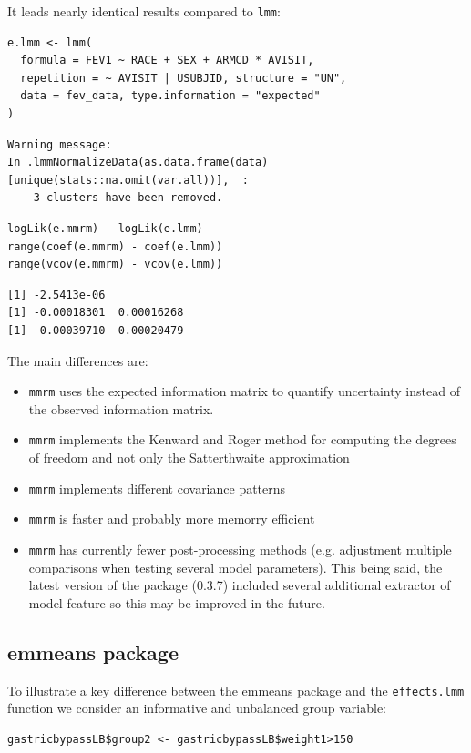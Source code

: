 \documentclass[12pt]{article}
\begin{document}
It leads nearly identical results compared to \texttt{lmm}:
\lstset{language=r,label= ,caption= ,captionpos=b,numbers=none}
\begin{lstlisting}
e.lmm <- lmm(
  formula = FEV1 ~ RACE + SEX + ARMCD * AVISIT,
  repetition = ~ AVISIT | USUBJID, structure = "UN",
  data = fev_data, type.information = "expected"
)
\end{lstlisting}
\begin{verbatim}
Warning message:
In .lmmNormalizeData(as.data.frame(data)[unique(stats::na.omit(var.all))],  :
    3 clusters have been removed.
\end{verbatim}


\lstset{language=r,label= ,caption= ,captionpos=b,numbers=none}
\begin{lstlisting}
logLik(e.mmrm) - logLik(e.lmm)
range(coef(e.mmrm) - coef(e.lmm))
range(vcov(e.mmrm) - vcov(e.lmm))
\end{lstlisting}

\begin{verbatim}
[1] -2.5413e-06
[1] -0.00018301  0.00016268
[1] -0.00039710  0.00020479
\end{verbatim}


The main differences are:
\begin{itemize}
\item \texttt{mmrm} uses the expected information matrix to quantify uncertainty
instead of the observed information matrix.
\item \texttt{mmrm} implements the Kenward and Roger method for computing the degrees of
freedom and not only the Satterthwaite approximation
\item \texttt{mmrm} implements different covariance patterns
\item \texttt{mmrm} is faster and probably more memorry efficient
\item \texttt{mmrm} has currently fewer post-processing methods (e.g. adjustment
multiple comparisons when testing several model parameters). This
being said, the latest version of the package (0.3.7) included
several additional extractor of model feature so this may be
improved in the future.
\end{itemize}

\subsection{emmeans package}
\label{sec:org3063712}

To illustrate a key difference between the emmeans package and the
\texttt{effects.lmm} function we consider an informative and unbalanced group
variable:
\lstset{language=r,label= ,caption= ,captionpos=b,numbers=none}
\begin{lstlisting}
gastricbypassLB$group2 <- gastricbypassLB$weight1>150
\end{lstlisting}
\end{document}
